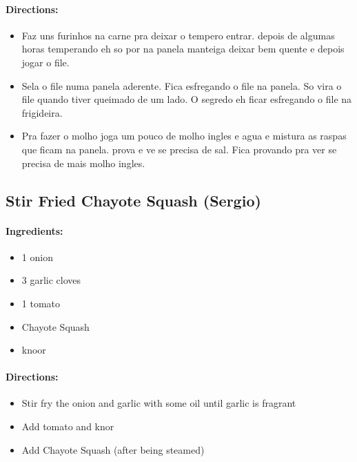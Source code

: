 \documentclass{article}
\begin{document}
\paragraph{Directions:}
\begin{itemize}
	\item Faz uns furinhos na carne pra deixar o tempero entrar. depois de algumas horas temperando eh so por na panela manteiga deixar bem quente e depois jogar o file.
	\item Sela o file numa panela aderente. Fica esfregando o file na panela. So vira o file quando tiver queimado de um lado. O segredo eh ficar esfregando o file na frigideira.
	\item Pra fazer o molho joga um pouco de molho ingles e agua e mistura as raspas que ficam na panela. prova e ve se precisa de sal. Fica provando pra ver se precisa de mais molho ingles.
\end{itemize}

\subsection{Stir Fried Chayote Squash (Sergio)}

\paragraph{Ingredients:}

\begin{itemize}
	\item 1 onion
	\item 3 garlic cloves
	\item 1 tomato
	\item Chayote Squash
	\item knoor 
\end{itemize}

\paragraph{Directions:}
\begin{itemize}
	\item Stir fry the onion and garlic with some oil until garlic is fragrant
	\item Add tomato and knor
	\item Add Chayote Squash (after being steamed)
\end{itemize}
\end{document}
